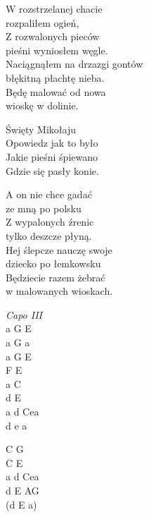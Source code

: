 \begin{text}
    \chordfill
    W rozstrzelanej chacie\\
    rozpaliłem ogień,\\
    Z rozwalonych pieców\\
    pieśni wyniosłem węgle.\\
    Naciągnąłem na drzazgi gontów\\
    błękitną płachtę nieba.\\
    Będę malować od nowa\\
    wioskę w dolinie.

    \vin Święty Mikołaju\\
    \vin Opowiedz jak to było\\
    \vin Jakie pieśni śpiewano\\
    \vin Gdzie się pasły konie.

    A on nie chce gadać\\
    ze mną po polsku\\
    Z wypalonych źrenic\\
    tylko deszcze płyną.\\
    Hej ślepcze nauczę swoje\\
    dziecko po łemkowsku\\
    Będziecie razem żebrać\\
    w malowanych wioskach.
\end{text}
\begin{chord}
    \textit{Capo III}\\
    a G E\\
    a G a\\
    a G E\\
    F E\\
    a C\\
    d E\\
    a d Cea\\
    d e a

    C G\\
    C E\\
    a d Cea\\
    d E AG\\
    (d E a)
\end{chord}